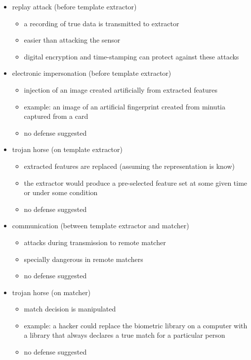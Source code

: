 \documentclass[paper=a4, fontsize=11pt]{scrartcl} %
\numberwithin{equation}{section} %
\numberwithin{figure}{section} %
\numberwithin{table}{section} %
\begin{document}
\begin{itemize}
\item replay attack (before template extractor)
\begin{itemize}
\item a recording of true data is transmitted to extractor
\item easier than attacking the sensor
\item digital encryption and time-stamping can protect against these attacks
\end{itemize}
\item electronic impersonation (before template extractor)
\begin{itemize}
\item injection of an image created artificially from extracted features
\item example: an image of an artificial fingerprint created from minutia captured from a card
\item no defense suggested
\end{itemize}
\item trojan horse (on template extractor)
\begin{itemize}
\item extracted features are replaced (assuming the representation is know)
\item the extractor would produce a pre-selected feature set at some given time or under some condition
\item no defense suggested
\end{itemize}
\item communication (between template extractor and matcher)
\begin{itemize}
\item attacks during transmission to remote matcher
\item specially dangerous in remote matchers
\item no defense suggested
\end{itemize}
\item trojan horse (on matcher)
\begin{itemize}
\item match decision is manipulated
\item example: a hacker could replace the biometric library on a computer with a library that always declares a true match for a particular person
\item no defense suggested
\end{itemize}
\end{itemize}
\end{document}
